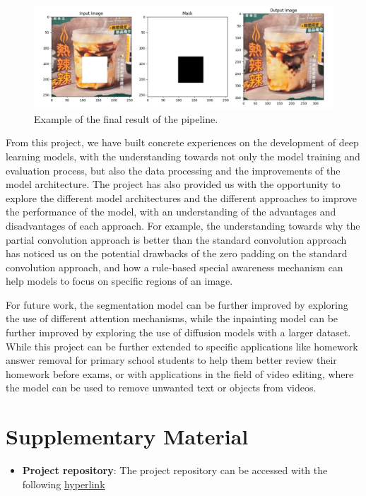 \documentclass[10pt,twocolumn,letterpaper]{article}
\begin{document}
\begin{figure}[t]
    \centering
    \includegraphics[width=\linewidth]{figures/milestone/final_result.jpg}
    \caption{Example of the final result of the pipeline.}
    \label{fig:final_result}
\end{figure}

From this project, we have built concrete experiences on the development of deep learning models, with the understanding towards not only the model training and evaluation process, but also the 
data processing and the improvements of the model architecture. The project has also provided us with the opportunity to explore the different model architectures and the different approaches to 
improve the performance of the model, with an understanding of the advantages and disadvantages of each approach. For example, the understanding towards why the partial convolution approach is
better than the standard convolution approach has noticed us on the potential drawbacks of the zero padding on the standard convolution approach, and how a rule-based special awareness mechanism can help
models to focus on specific regions of an image.

For future work, the segmentation model can be further improved by exploring the use of different attention mechanisms, while the inpainting model can be further improved by exploring the use of 
diffusion models with a larger dataset. While this project can be further extended to specific applications like homework answer removal for primary school students to help them better review their homework
before exams, or with applications in the field of video editing, where the model can be used to remove unwanted text or objects from videos.

\section{Supplementary Material}

\begin{itemize}
    \item \textbf{Project repository}: The project repository can be accessed with the following \href{https://github.com/GLGDLY/ELEC4240_project}{hyperlink}
\end{itemize}

{\small


}
\end{document}
